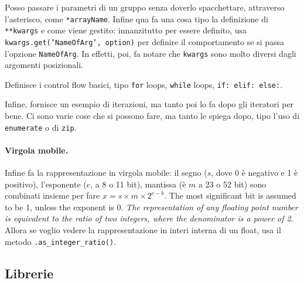 \documentclass[10pt, a4paper, titlepage]{book}
\begin{document}
Posso passare i parametri di un gruppo senza doverlo spacchettare, attraverso l'asterisco, come \texttt{*arrayName}.
Infine qua fa una cosa tipo la definizione di \texttt{**kwargs} e come viene gestito: innanzitutto per essere definito, usa \texttt{kwargs.get('NameOfArg', option)} per definire il comportamento se si passa l'opzione \texttt{NameOfArg}. In effetti, poi, fa notare che \texttt{kwargs} sono molto diversi dagli argomenti posizionali.

Definisce i control flow basici, tipo \texttt{for} loops, \texttt{while} loops, \texttt{if: elif: else:}.

Infine, fornisce un esempio di iterazioni, ma tanto poi lo fa dopo gli iteratori per bene. Ci sono varie cose che si possono fare, ma tanto le spiega dopo, tipo l'uso di \texttt{enumerate} o di \texttt{zip}.

\paragraph{Virgola mobile.} Infine fa la rappresentazione in virgola mobile: il segno ($s$, dove 0 è negativo e 1 è positivo), l'esponente ($e$, a 8 o 11 bit), mantissa (è $m$ a 23 o 52 bit) sono combinati insieme per fare $x=s\times m\times 2^{e-b}$. 
The most significant bit is assumed to be 1, unless the exponent is 0.
\textit{The representation of any floating point number is equivalent to
the ratio of two integers, where the denominator is a power of 2}.
Allora se voglio vedere la rappresentazione in interi interna di un float, usa il metodo \texttt{.as\_integer\_ratio()}.

\subsection{Librerie}
\end{document}
